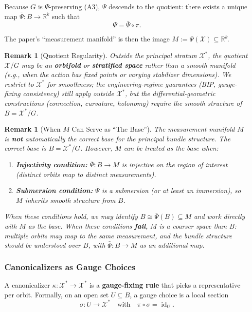 \documentclass[12pt]{article}
\newtheorem{remark}[theorem]{Remark}
\begin{document}
Because $G$ is $\Psi$-preserving (A3), $\Psi$ descends to the quotient: there exists a unique map $\bar{\Psi} :
B \to \mathbb{R}^k$ such that
\[
\Psi = \bar{\Psi} \circ \pi.
\]

The paper's ``measurement manifold'' is then the image $M := \Psi(\mathcal{X}) \subseteq \mathbb{R}^k$.

\begin{remark}[Quotient Regularity]
\emph{Outside the principal stratum $\mathcal{X}^*$, the quotient $\mathcal{X}/G$ may be
an \textbf{orbifold} or \textbf{stratified space} rather than a smooth manifold (e.g., when the action has fixed
points or varying stabilizer dimensions). We restrict to $\mathcal{X}^*$ for smoothness; the engineering-regime
guarantees (BIP, gauge-fixing consistency) still apply outside $\mathcal{X}^*$, but the differential-geometric
constructions (connection, curvature, holonomy) require the smooth structure of $B = \mathcal{X}^*/G$.}
\end{remark}

\begin{remark}[When $M$ Can Serve as ``The Base'']
\emph{The measurement manifold $M$ is \textbf{not} automatically the correct base for the principal bundle structure. The correct base is $B = \mathcal{X}^*/G$. However,
$M$ can be treated as the base when:}
\begin{enumerate}
\item \emph{\textbf{Injectivity condition:} $\bar{\Psi} : B \to M$ is injective on the region of interest (distinct orbits map
to distinct measurements).}
\item \emph{\textbf{Submersion condition:} $\bar{\Psi}$ is a submersion (or at least an immersion), so $M$ inherits
smooth structure from $B$.}
\end{enumerate}

\emph{When these conditions hold, we may identify $B \cong \bar{\Psi}(B) \subseteq M$ and work directly with $M$ as the
base. When these conditions \textbf{fail}, $M$ is a coarser space than $B$: multiple orbits may map to the
same measurement, and the bundle structure should be understood over $B$, with $\bar{\Psi} : B \to M$ as an
additional map.}
\end{remark}

\subsubsection{Canonicalizers as Gauge Choices}

A canonicalizer $\kappa : \mathcal{X}^* \to \mathcal{X}^*$ is a \textbf{gauge-fixing rule} that picks a representative per orbit. Formally,
on an open set $U \subseteq B$, a gauge choice is a local section
\[
\sigma : U \to \mathcal{X}^* \quad \text{with} \quad \pi \circ \sigma = \operatorname{id}_U.
\]
\end{document}
